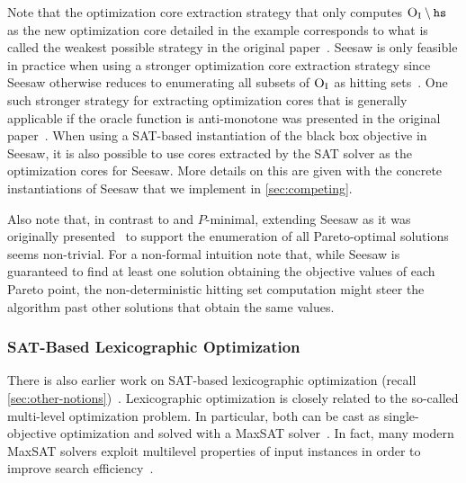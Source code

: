 Note that the optimization core extraction strategy that only computes $\textsc{O}_{\text{I}} \setminus \texttt{hs}$ as the new optimization core detailed in the example corresponds to what is called the weakest possible strategy in the original paper~\autocite{DBLP:conf/cp/JanotaMSM21}.
Seesaw is only feasible in practice when using a stronger optimization core extraction strategy since Seesaw otherwise reduces to enumerating all subsets of $\textsc{O}_{\text{I}}$ as hitting sets~\autocite{DBLP:conf/cp/JanotaMSM21}.
One such stronger strategy for extracting optimization cores that is generally applicable if the oracle function is anti-monotone was presented in the original paper~\autocite{DBLP:conf/cp/JanotaMSM21}.
When using a SAT-based instantiation of the black box objective in Seesaw, it is also possible to use cores extracted by the SAT solver as the optimization cores for Seesaw.
More details on this are given with the concrete instantiations of Seesaw that we implement in \cref{sec:competing}.

Also note that, in contrast to \algname{} and $P$-minimal, extending Seesaw as it was originally presented~\autocite{DBLP:conf/cp/JanotaMSM21} to support the enumeration of all Pareto-optimal solutions seems non-trivial.
For a non-formal intuition note that, while Seesaw is guaranteed to find at least one solution obtaining the objective values of each Pareto point, the non-deterministic hitting set computation might steer the algorithm past other solutions that obtain the same values.

\subsubsection{SAT-Based Lexicographic Optimization\label{sec:lex-opt}}

There is also earlier work on SAT-based lexicographic optimization (recall \cref{sec:other-notions})~\autocites{DBLP:journals/ors/EhrgottG00,DBLP:conf/ijcai/ArgelichLS09,DBLP:journals/amai/Marques-SilvaAGL11}. 
Lexicographic optimization is closely related to the so-called multi-level optimization problem.
In particular, both can be cast as single-objective optimization and solved with a MaxSAT solver~\autocites{DBLP:conf/ijcai/ArgelichLS09,DBLP:journals/amai/Marques-SilvaAGL11}.
In fact, many modern MaxSAT solvers exploit multilevel properties of input instances in order to improve search efficiency~\autocites{DBLP:conf/vmcai/PaxianRB21,DBLP:conf/cp/AnsoteguiBGL12}.

